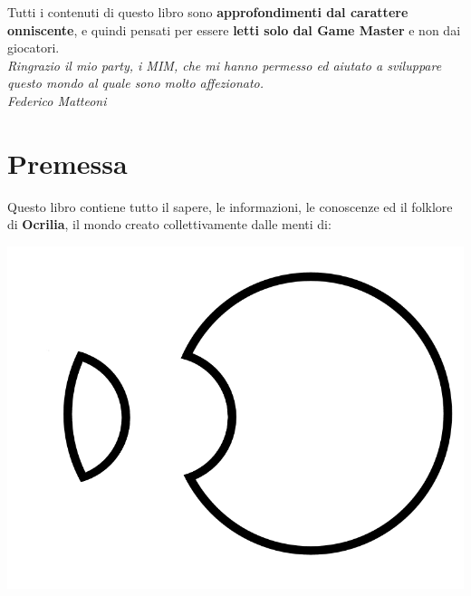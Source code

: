 \documentclass[10pt,twoside,onecolumn,openany]{book}
\begin{document}
\selectfont %
\begin{Large}
\begin{center}
Tutti i contenuti di questo libro sono \textbf{approfondimenti dal carattere onniscente}, e quindi pensati per essere \textbf{letti solo dal Game Master} e non dai giocatori.\\
\textit{Ringrazio il mio party, i MIM, che mi hanno permesso ed aiutato a sviluppare questo mondo al quale sono molto affezionato.\\Federico Matteoni}
\end{center}
\end{Large}
\pagebreak
\chapter{Premessa}
\begin{large}
Questo libro contiene tutto il sapere, le informazioni, le conoscenze ed il folklore di \textbf{Ocrilia}, il mondo creato collettivamente dalle menti di:
\begin{center}
\end{center}
\end{large}
\begin{center}
\includegraphics[scale=0.6]{Ocriliasymbol}
\end{center}
\end{document}
